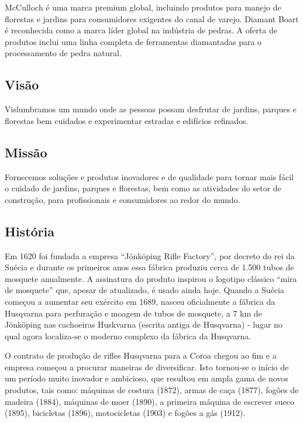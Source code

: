 \documentclass[12pt]{article}
\begin{document}
	McCulloch é uma marca premium global, incluindo produtos para manejo de florestas e jardins para consumidores exigentes do canal de varejo. 
	Diamant Boart é reconhecida como a marca líder global na indústria de pedras. A oferta de produtos inclui uma linha completa de ferramentas diamantadas para o processamento de pedra natural.	

\subsection{Visão}
	Vislumbramos um mundo onde as pessoas possam desfrutar de jardins, parques e florestas bem cuidados e experimentar estradas e edifícios refinados.

\subsection{Missão}
	Fornecemos soluções e produtos inovadores e de qualidade para tornar mais fácil o cuidado de jardins, parques e florestas, bem como as atividades do setor de construção, para profissionais e consumidores ao redor do mundo.

	
\subsection{História}
	Em 1620 foi fundada a empresa “Jönköping Rifle Factory”, por decreto do rei da Suécia e durante os primeiros anos essa fábrica produziu cerca de 1.500 tubos de mosquete anualmente. A assinatura do produto inspirou o logotipo clássico “mira de mosquete” que, apesar de atualizado, é usado ainda hoje.
	Quando a Suécia começou a aumentar seu exército em 1689, nasceu oficialmente a fábrica da Husqvarna para perfuração e moagem de tubos de mosquete, a 7 km de Jönköping nas cachoeiras Huskvarna (escrita antiga de Husqvarna) - lugar no qual agora localiza-se o moderno complexo da fábrica da Husqvarna.

	O contrato de produção de rifles Husqvarna para a Coroa chegou ao fim e a empresa começou a procurar maneiras de diversificar. Isto tornou-se o início de um período muito inovador e ambicioso, que resultou em ampla gama de novos produtos, tais como: máquinas de costura (1872), armas de caça (1877), fogões de madeira (1884), máquinas de moer (1890), a primeira máquina de escrever sueco (1895), bicicletas (1896), motocicletas (1903) e fogões a gás (1912).
\end{document}
